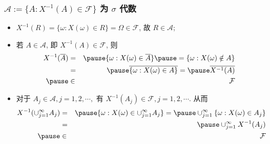 \documentclass[Prob-All.tex]{subfiles}
\begin{document}
\begin{frame}
	\frametitle{$\mathcal{A}:=\{A:X^{-1}(A)\in \mathcal{F}\}$ 为 $\sigma$ 代数}
	\begin{itemize}[<+-|alert@+>]
		\item $X^{-1}(R)=\{\omega:X (\omega)\in R\}=\Omega\in \mathcal{F}$, 故 $R\in\mathcal{A}$;
		\item 若 $A\in\mathcal{A}$, 即 $X^{-1}(A)\in \mathcal{F}$, 则
		      \begin{eqnarray*}
			      X^{-1}(\overline{A})&=&\pause \{\omega: X(\omega)\in \overline{A}\}\pause =\{\omega:X(\omega)\notin A\}\\
			      &=&\pause \overline{\{\omega:X(\omega)\in A\}}=\pause \overline{X^{-1}(A)}\\ \pause &\in&  \mathcal{F}
		      \end{eqnarray*}
		\item 对于 $A_j\in \mathcal{A}, j=1,2,\cdots,$ 有 $X^{-1}(A_j)\in \mathcal{F},j=1,2,\cdots.$ 从而
		      \begin{eqnarray*}
			      X^{-1}(\cup_{j=1}^\infty A_j)&=&\pause \{\omega:X(\omega)\in\cup_{j=1}^\infty A_j\}
			      =\pause \cup_{j=1}^\infty \{\omega:X(\omega)\in A_j\}\\
			      &=&\pause \cup_{j=1}^\infty X^{-1}(A_j)\\ \pause &\in&\mathcal{F}
		      \end{eqnarray*}

	\end{itemize}
\end{frame}
\end{document}
